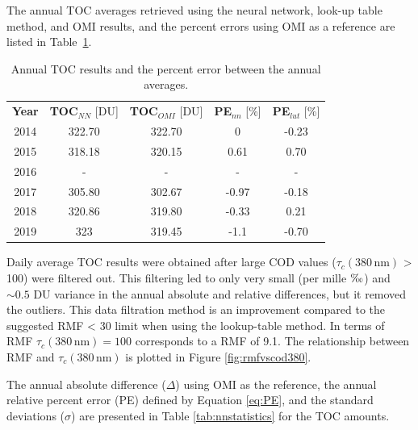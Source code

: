 \documentclass{optica-article}
\begin{document}
The annual TOC averages retrieved using the neural network, look-up table method, and OMI results, and the percent errors using OMI as a reference are listed in Table~\ref{tab:annualstats}.

\begin{table}
	\centering
	\begin{tabular}{|c|c|c|c|c|}
		\hline
		\textbf{Year} & \textbf{TOC}$_{NN}$ [DU] & \textbf{TOC}$_{OMI}$ [DU]   & \textbf{PE}$_{nn}$ [\%] & \textbf{PE}$_{lut}$ [\%]  \\
		\Xhline{2\arrayrulewidth}
		2014 & 322.70 & 322.70 & 0 & -0.23 \\
		\hline
		2015 & 318.18 & 320.15 & 0.61 & 0.70 \\
		\hline
		2016 & - & - & - & - \\
		\hline
		2017 & 305.80 & 302.67 & -0.97 & -0.18 \\
		\hline
		2018 & 320.86 & 319.80 & -0.33 & 0.21 \\
		\hline
		2019 & 323 &  319.45 & -1.1 & -0.70 \\
		\hline
	\end{tabular}
	\caption{Annual TOC results and the percent error between the annual averages.}
	\label{tab:annualstats}
\end{table}


Daily average TOC results were obtained after large COD values ($\tau_c{\scriptstyle(380 \, \text{nm})}$ > 100)  were filtered out.
This filtering led to only very small (per mille $\text{\textperthousand}$) and $\sim 0.5$ DU variance in the annual absolute and relative  differences, but it removed the outliers.
This data filtration method is an improvement compared to the suggested \cite{Hoiskar2003}  RMF < 30 limit when using the lookup-table method.
In terms of RMF $\tau_c{\scriptstyle(380 \, \text{nm})} = 100$ corresponds to  a RMF of 9.1.
The relationship between RMF and $\tau_c{\scriptstyle(380 \, \text{nm})}$ is plotted in Figure \ref{fig:rmfvscod380}.


The annual absolute difference ($\Delta$) using OMI as the reference, the annual relative percent error (PE) defined by Equation \ref{eq:PE}, and the standard deviations ($\sigma$)  are presented in Table \ref{tab:nnstatistics} for the TOC amounts.
\end{document}
